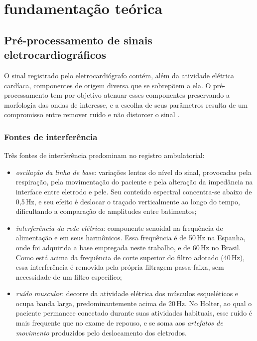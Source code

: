 \chapter{fundamentação teórica}
\label{cap:fundamentacao-teorica}



%

\section{Pré-processamento de sinais eletrocardiográficos}
\label{sec:fund-preprocessamento}

O sinal registrado pelo eletrocardiógrafo contém, além da atividade
elétrica cardíaca, componentes de origem diversa que se sobrepõem a ela. O
pré-processamento tem por objetivo atenuar esses componentes preservando a
morfologia das ondas de interesse, e a escolha de seus parâmetros resulta de
um compromisso entre remover ruído e não distorcer o sinal
\cite{clifford2006advanced}.

\subsection{Fontes de interferência}
\label{subsec:fund-ruidos}

Três fontes de interferência predominam no registro ambulatorial:

\begin{itemize}
	\item \textit{oscilação da linha de base}: variações lentas do nível do
	      sinal, provocadas pela respiração, pela movimentação do paciente e
	      pela alteração da impedância na interface entre eletrodo e pele. Seu
	      conteúdo espectral concentra-se abaixo de 0,5\,Hz, e seu efeito é
	      deslocar o traçado verticalmente ao longo do tempo, dificultando a
	      comparação de amplitudes entre batimentos;
	\item \textit{interferência da rede elétrica}: componente senoidal na
	      frequência de alimentação e em seus harmônicos. Essa frequência é de
	      50\,Hz na Espanha, onde foi adquirida a base empregada neste
	      trabalho, e de 60\,Hz no Brasil. Como está acima da frequência de
	      corte superior do filtro adotado (40\,Hz), essa interferência é
	      removida pela própria filtragem passa-faixa, sem necessidade de um
	      filtro específico;
	\item \textit{ruído muscular}: decorre da atividade elétrica dos
	      músculos esqueléticos e ocupa banda larga, predominantemente acima de
	      20\,Hz. No Holter, ao qual o paciente permanece conectado durante
	      suas atividades habituais, esse ruído é mais frequente que no exame
	      de repouso, e se soma aos \textit{artefatos de movimento} produzidos
	      pelo deslocamento dos eletrodos.
\end{itemize}

